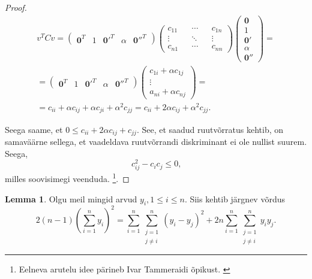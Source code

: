 \documentclass[a4paper,12pt,oneside]{article}
\newcounter{lemma}[section]
\numberwithin{equation}{section}
\theoremstyle{definition}
\newtheorem{helper_2}[lemma]{Lemma}
\begin{document}
\begin{proof}
\begin{equation*}
\begin{gathered}
v^{T}Cv =
\begin{pmatrix}
\mathbf{0}^T & 1 & \mathbf{0'}^T & \alpha & \mathbf{0''}^T
\end{pmatrix}
\begin{pmatrix}
c_{11} && \cdots && c_{1n} \\
\vdots && \ddots && \vdots \\
c_{n1} && \cdots && c_{nn}  
\end{pmatrix}
\begin{pmatrix}
\mathbf{0} \\ 
1 \\
\mathbf{0'} \\
\alpha \\
\mathbf{0''} 
\end{pmatrix}  =\\
= \begin{pmatrix}
\mathbf{0}^T & 1 & \mathbf{0'}^T & \alpha & \mathbf{0''}^T
\end{pmatrix}
\begin{pmatrix}
c_{1i} + \alpha c_{1j} \\
\vdots \\
a_{ni} + \alpha c_{nj} 
\end{pmatrix}
= \\
= c_{ii} + \alpha c_{ij} + \alpha c_{ji} + \alpha^2 c_{jj} = c_{ii} + 2 \alpha c_{ij} + \alpha^2 c_{jj} \text{.}
\end{gathered}
\end{equation*}


Seega saame, et $ 0 \leq c_{ii} + 2\alpha{c_{ij}} + c_{jj}$. See, et saadud ruutvõrratus kehtib, on samaväärne sellega, et vaadeldava ruutvõrrandi diskriminant ei ole nullist suurem. Seega,   
\begin{equation*}
c_{ij}^2 - c_{i}c_{j} \leq 0 \text{,} 
\end{equation*}
milles soovisimegi veenduda. \footnote{ Eelneva arutelu idee pärineb Ivar Tammeraidi õpikust. \cite{Tammeraid1999}}.
\end{proof}  


\begin{helper_2}
Olgu meil mingid arvud $y_i, 1 \leq i  \leq n $.  Siis kehtib järgnev võrdus 
\begin{equation*}
2 \left( n-1 \right) \left( \sum \limits_{i=1}^n y_{i} \right)^2  = \sum \limits_{i=1}^n   \sum \limits_{\substack{j=1 \\ j \neq i}}^{n} (y_{i} - y_{j})^2  +  2 n \sum \limits_{i=1}^n \sum \limits_{\substack{j=1 \\ j \neq i}}^{n} y_{i} y_{j} \text{.}
\end{equation*}
\end{helper_2}
\end{document}
